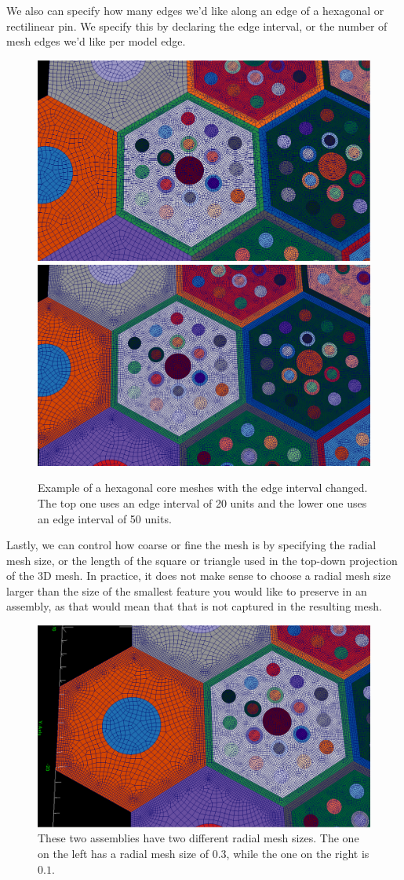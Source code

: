 We also can specify how many edges we'd like along an edge of a hexagonal or rectilinear pin.  We specify this by declaring the edge interval, or the number of mesh edges we'd like per model edge.

\begin{figure}[H]
	\begin{center}
		\includegraphics[width=0.5\linewidth]{Images/edge-interval-20.png}
		\includegraphics[width=0.5\linewidth]{Images/edge-interval-50.png}

		\caption{Example of a hexagonal core meshes with the edge interval changed.  The top one uses an edge interval of 20 units and the lower one uses an edge interval of 50 units.}
		\label{fig:EdgeInterval}
	\end{center}
\end{figure}

Lastly, we can control how coarse or fine the mesh is by specifying the radial mesh size, or the length of the square or triangle used in the top-down projection of the 3D mesh.  In practice, it does not make sense to choose a radial mesh size larger than the size of the smallest feature you would like to preserve in an assembly, as that would mean that that is not captured in the resulting mesh.

\begin{figure}[H]
	\begin{center}
		\includegraphics[width=0.5\linewidth]{Images/radial-mesh-size.png}
		\caption{These two assemblies have two different radial mesh sizes.  The one on the left has a radial mesh size of $0.3$, while the one on the right is $0.1$.}
		\label{fig:RadialMesh}
	\end{center}
\end{figure}

